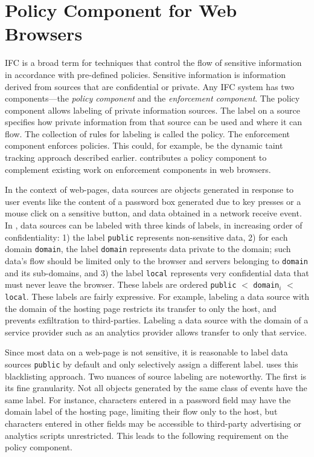 \section{Policy Component for Web Browsers}
\label{sec:overview}

IFC is a broad term for techniques that control the flow of sensitive
information in accordance with pre-defined policies. Sensitive
information is information derived from sources that are confidential
or private. Any IFC system has two components---the \emph{policy
  component} and the \emph{enforcement component}. The policy
component allows labeling of private information sources. The label on
a source specifies how private information from that source can be
used and where it can flow. The collection of rules for labeling is
called the policy. The enforcement component enforces policies. This
could, for example, be the dynamic taint tracking approach described
earlier. {\sys} contributes a policy component to complement existing
work on enforcement components in web browsers. 

In the context of web-pages, data sources are objects generated in
response to user events like the content of a password box generated
due to key presses or a mouse click on a sensitive button, and data
obtained in a network receive event. In {\sys}, data sources can be
labeled with three kinds of labels, in increasing order of
confidentiality: 1) the label \texttt{public} represents non-sensitive
data, 2) for each domain \texttt{domain}, the label \texttt{domain}
represents data private to the domain; such data's flow should be
limited only to the browser and servers belonging to \texttt{domain}
and its sub-domains, and 3) the label \texttt{local} represents very
confidential data that must never leave the browser. These labels are
ordered \texttt{public} $<$ \texttt{domain}$_i$ $<$
\texttt{local}. These labels are fairly expressive. For example,
labeling a data source with the domain of the hosting page restricts
its transfer to only the host, and prevents exfiltration to
third-parties. Labeling a data source with the domain of a service
provider such as an analytics provider allows transfer to only that
service. 

Since most data on a web-page is not sensitive, it is reasonable to
label data sources \texttt{public} by default and only selectively
assign a different label. {\sys} uses this blacklisting approach.  Two
nuances of source labeling are noteworthy. The first is its fine
granularity. Not all objects generated by the same class of events
have the same label. For instance, characters entered in a password
field may have the domain label of the hosting page, limiting their
flow only to the host, but characters entered in other fields may be
accessible to third-party advertising or analytics scripts
unrestricted. This leads to the following requirement on the policy
component.

